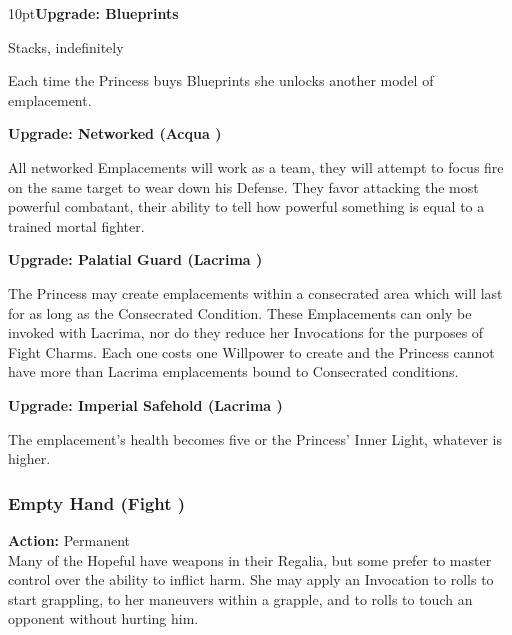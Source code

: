  \begin{myindentpar}{10pt}\textbf{Upgrade: Blueprints}

Stacks, indefinitely

Each time the Princess buys Blueprints she unlocks another model of emplacement. 

\textbf{Upgrade: Networked (Acqua \textbullet\textbullet)}

All networked Emplacements will work as a team, they will attempt to focus fire on the same target to wear down his Defense. They favor attacking the most powerful combatant, their ability to tell how powerful something is equal to a trained mortal fighter. 

\textbf{Upgrade: Palatial Guard (Lacrima \textbullet\textbullet)}

The Princess may create emplacements within a consecrated area which will last for as long as the Consecrated Condition. These Emplacements can only be invoked with Lacrima, nor do they reduce her Invocations for the purposes of Fight Charms. Each one costs one Willpower to create and the Princess cannot have more than Lacrima emplacements bound to Consecrated conditions. 

\textbf{Upgrade: Imperial Safehold (Lacrima \textbullet\textbullet)}

The emplacement's health becomes five or the Princess' Inner Light, whatever is higher. 

\end{myindentpar}

\subsubsection*{Empty Hand (Fight \textbullet)}

\noindent \textbf{Action:} Permanent \\

\noindent Many of the Hopeful have weapons in their Regalia, but some prefer to master control over the ability to inflict harm. She may apply an Invocation to rolls to start grappling, to her maneuvers within a grapple, and to rolls to touch an opponent without hurting him.

